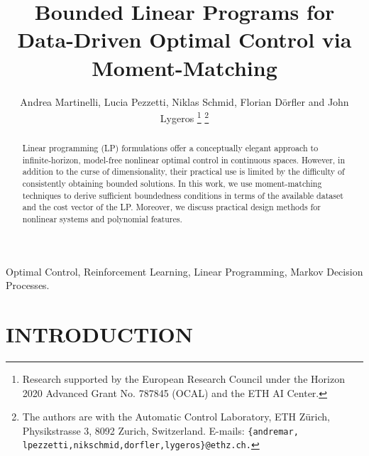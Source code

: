 \documentclass[journal,twoside,web]{ieeecolor}
\begin{document}
\title{Bounded Linear Programs for Data-Driven Optimal Control via Moment-Matching}

\author{Andrea Martinelli, Lucia Pezzetti, Niklas Schmid, Florian D\"orfler and John Lygeros
\thanks{Research supported by the European Research Council under the Horizon 2020 Advanced Grant No. 787845 (OCAL) and the ETH AI Center.}%
\thanks{The authors are with the Automatic Control Laboratory, ETH Z\"urich, Physikstrasse 3, 8092 Zurich, Switzerland. E-mails: \tt\footnotesize \{andremar, lpezzetti,nikschmid,dorfler,lygeros\}@ethz.ch.}%
}

\maketitle
\thispagestyle{empty}

\begin{abstract}

Linear programming (LP) formulations offer a conceptually elegant approach to infinite-horizon, model-free nonlinear optimal control in continuous spaces. However, in addition to the curse of dimensionality, their practical use is limited by the difficulty of consistently obtaining bounded solutions.
In this work, we use moment-matching techniques to derive sufficient boundedness conditions in terms of the available dataset and the cost vector of the LP. Moreover, we discuss practical design methods for nonlinear systems and polynomial features.
\end{abstract}

\begin{IEEEkeywords}
Optimal Control, Reinforcement Learning, Linear Programming, Markov Decision Processes.
\end{IEEEkeywords}


\section{INTRODUCTION} \label{Sec:intro}
\end{document}
